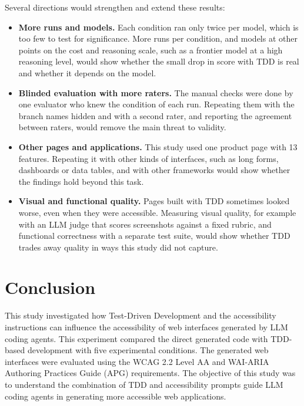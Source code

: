 \documentclass[conference]{IEEEtran}
\begin{document}
Several directions would strengthen and extend these results:
\begin{itemize}
  \item \textbf{More runs and models.} Each condition ran only twice per model, which is too few to test for significance. More runs per condition, and models at other points on the cost and reasoning scale, such as a frontier model at a high reasoning level, would show whether the small drop in score with TDD is real and whether it depends on the model.
  \item \textbf{Blinded evaluation with more raters.} The manual checks were done by one evaluator who knew the condition of each run. Repeating them with the branch names hidden and with a second rater, and reporting the agreement between raters, would remove the main threat to validity.
  \item \textbf{Other pages and applications.} This study used one product page with 13 features. Repeating it with other kinds of interfaces, such as long forms, dashboards or data tables, and with other frameworks would show whether the findings hold beyond this task.
  \item \textbf{Visual and functional quality.} Pages built with TDD sometimes looked worse, even when they were accessible. Measuring visual quality, for example with an LLM judge that scores screenshots against a fixed rubric, and functional correctness with a separate test suite, would show whether TDD trades away quality in ways this study did not capture.
\end{itemize}

\section{Conclusion}

This study investigated how Test-Driven Development and the accessibility instructions can influence the accessibility of web interfaces generated by LLM coding agents. This experiment compared the direct generated code with TDD-based development with five experimental conditions. The generated web interfaces were evaluated using the WCAG 2.2 Level AA and WAI-ARIA Authoring Practices Guide (APG) requirements. The objective of this study was to understand the combination of TDD and accessibility prompts guide LLM coding agents in generating more accessible web applications.
\end{document}
